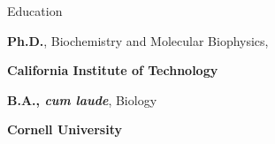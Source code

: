 \begin{rubric}{Education}

\entry*[2013--2018]
	\textbf{Ph.D.}, Biochemistry and Molecular Biophysics,
	\par \textbf{California Institute of Technology}


\entry*[2009--2013]%
	\textbf{B.A., \emph{cum laude}}, Biology\par
	\par \textbf{Cornell University}

\end{rubric}
